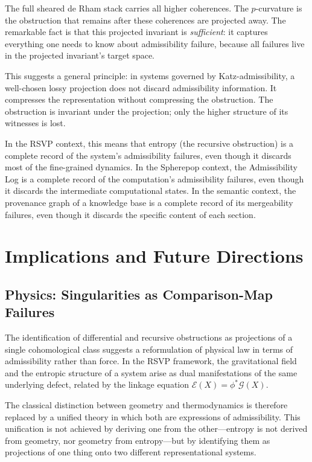 \documentclass[12pt]{article}
\begin{document}
The full sheared de Rham stack carries all higher coherences. The $p$-curvature is the
obstruction that remains after these coherences are projected away. The remarkable fact
is that this projected invariant is \emph{sufficient}: it captures everything one needs
to know about admissibility failure, because all failures live in the projected
invariant's target space.

This suggests a general principle: in systems governed by Katz-admissibility, a
well-chosen lossy projection does not discard admissibility information. It compresses
the representation without compressing the obstruction. The obstruction is invariant
under the projection; only the higher structure of its witnesses is lost.

In the RSVP context, this means that entropy (the recursive obstruction) is a
complete record of the system's admissibility failures, even though it discards most
of the fine-grained dynamics. In the Spherepop context, the Admissibility Log is a
complete record of the computation's admissibility failures, even though it discards
the intermediate computational states. In the semantic context, the provenance graph
of a knowledge base is a complete record of its mergeability failures, even though it
discards the specific content of each section.

\section{Implications and Future Directions}

\subsection{Physics: Singularities as Comparison-Map Failures}

The identification of differential and recursive obstructions as projections of a
single cohomological class suggests a reformulation of physical law in terms of
admissibility rather than force. In the RSVP framework, the gravitational field and
the entropic structure of a system arise as dual manifestations of the same underlying
defect, related by the linkage equation $\mathcal{E}(X) = \phi^* \mathcal{G}(X)$.

The classical distinction between geometry and thermodynamics is therefore replaced by
a unified theory in which both are expressions of admissibility. This unification is
not achieved by deriving one from the other---entropy is not derived from geometry, nor
geometry from entropy---but by identifying them as projections of one thing onto two
different representational systems.
\end{document}
